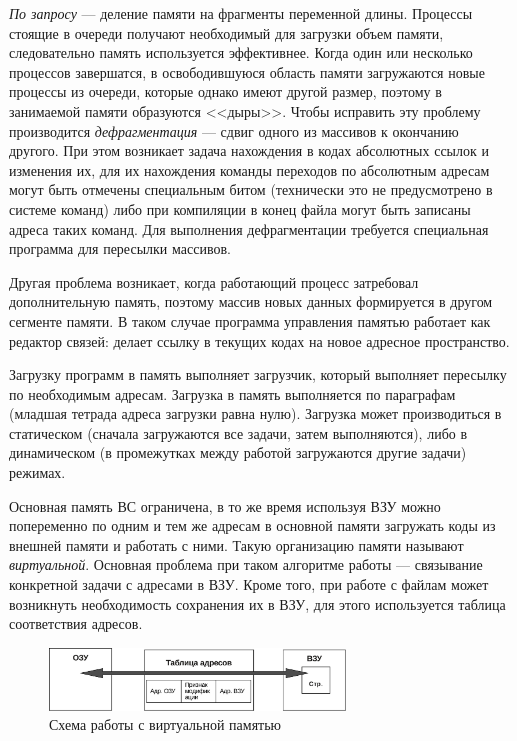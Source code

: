 \documentclass[unicode, 12pt, a4paper, oneside]{article}
\begin{document}
\textit{По запросу} --- деление памяти на фрагменты переменной длины. Процессы стоящие в очереди получают необходимый для загрузки объем памяти, следовательно память используется эффективнее. Когда один или несколько процессов завершатся, в освободившуюся область памяти загружаются новые процессы из очереди, которые однако имеют другой размер, поэтому в занимаемой памяти образуются <<дыры>>. Чтобы исправить эту проблему производится \textit{дефрагментация} --- сдвиг одного из массивов к окончанию другого. При этом возникает задача нахождения в кодах абсолютных ссылок и изменения их, для их нахождения команды переходов по абсолютным адресам могут быть отмечены специальным битом (технически это не предусмотрено в системе команд) либо при компиляции в конец файла могут быть записаны адреса таких команд. Для выполнения дефрагментации требуется специальная программа для пересылки массивов.

Другая проблема возникает, когда работающий процесс затребовал дополнительную память, поэтому массив новых данных формируется в другом сегменте памяти. В таком случае программа управления памятью работает как редактор связей: делает ссылку в текущих кодах на новое адресное пространство.

Загрузку программ в память выполняет загрузчик, который выполняет пересылку по необходимым адресам. Загрузка в память выполняется по параграфам (младшая тетрада адреса загрузки равна нулю). Загрузка может производиться в статическом (сначала загружаются все задачи, затем выполняются), либо в динамическом (в промежутках между работой загружаются другие задачи) режимах.

Основная память ВС ограничена, в то же время используя ВЗУ можно попеременно по одним и тем же адресам в основной памяти загружать коды из внешней памяти и работать с ними. Такую организацию памяти называют \textit{виртуальной}. Основная проблема при таком алгоритме работы — связывание конкретной задачи с адресами в ВЗУ. Кроме того, при работе с файлам может возникнуть необходимость сохранения их в ВЗУ, для этого используется таблица соответствия адресов.

\begin{figure}[H]
\centering
\includegraphics[width=0.7\textwidth]{160_virtual_memory.pdf}
\caption{Схема работы с виртуальной памятью}
\end{figure}
\end{document}
